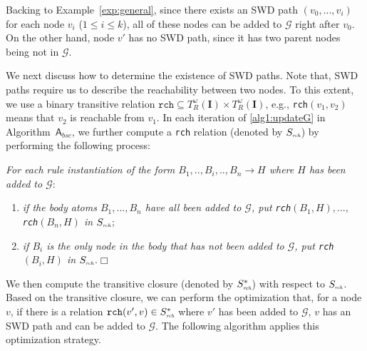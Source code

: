 \documentclass[final,1p,times]{elsarticle}
\begin{document}
Backing to Example~\ref{exp:general}, since
there exists an SWD path $(v_0,...,v_i)$ for each node $v_i$ ($1\leq i\leq k$), all of these nodes
can be added to $\mathcal{G}$ right after $v_0$. On the other hand,
node $v'$ has no SWD path, since it has two parent nodes being not in $\mathcal{G}$.

We next discuss how to determine the existence of SWD paths. Note that, SWD paths require us to
describe the reachability between two nodes. To this extent, we use a
binary transitive relation $\texttt{rch} \subseteq T_R^{\omega}(\textbf{I})\times T_R^{\omega}(\textbf{I})$,
e.g., \texttt{rch}$(v_1,v_2)$ means that $v_2$ is reachable from $v_1$.
In each iteration of \ref{alg1:updateG} in Algorithm~$\mathsf{A}_{bsc}$, we further compute a \texttt{rch}
relation (denoted by $S_{\textit{\tiny rch}}$) by performing the following process:

\begin{description}[leftmargin=2ex]
\item[(\textbf{\dag})] \emph{For each rule instantiation of the form $B_1,..,B_i,..,B_n\rightarrow H$
where $H$ has been added to $\mathcal{G}$}:
\begin{enumerate}[leftmargin=2ex]
\item \emph{if the body atoms $B_1,...,B_n$ have all been added to $\mathcal{G}$, put \texttt{rch}$(B_1,H),...,$ \texttt{rch}$(B_n,H)$ in $S_{\textit{\tiny rch}}$};
\item \emph{if $B_i$ is the only node in the body that has not been added to $\mathcal{G}$,
    put \texttt{rch}$(B_i,H)$ in $S_{\textit{\tiny rch}}$}.\hfill$\Box$
\end{enumerate}
\end{description}

We then compute the transitive closure (denoted by $S^*_{\textit{\tiny rch}}$) with respect to
$S_{\textit{\tiny rch}}$. Based on the transitive closure, we can perform the optimization that,
for a node $v$, if there is a relation $\texttt{rch}(v',v)\in S^*_{\textit{\tiny rch}}$
where $v'$ has been added to $\mathcal{G}$, $v$ has an SWD path and can be added to $\mathcal{G}$.
The following algorithm applies this optimization strategy.\\
\end{document}
